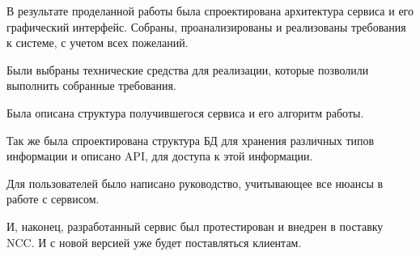 \Conclusion %

В результате проделанной работы была спроектирована архитектура сервиса и его графический интерфейс.
Собраны, проанализированы и реализованы требования к системе, с учетом всех пожеланий.

Были выбраны технические средства для реализации, которые позволили выполнить собранные требования.

Была описана структура получившегося сервиса и его алгоритм работы.

Так же была спроектирована структура БД для хранения различных типов информации и описано API,
для доступа к этой информации.

Для пользователей было написано руководство, учитывающее все нюансы в работе с сервисом.

И, наконец, разработанный сервис был протестирован и внедрен в поставку NCC\@.
И с новой версией уже будет поставляться клиентам.
